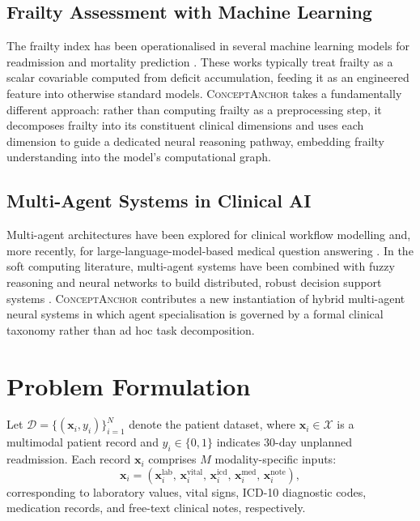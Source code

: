 \documentclass[review,12pt,authoryear]{elsarticle}
\newcommand{\modelname}{\textsc{ConceptAnchor}}
\begin{document}
\subsection{Frailty Assessment with Machine Learning}

The frailty index has been operationalised in several machine learning models for readmission and mortality prediction \citep{segal2019frailty, stow2019predicting}.
These works typically treat frailty as a scalar covariable computed from deficit accumulation, feeding it as an engineered feature into otherwise standard models.
\modelname{} takes a fundamentally different approach: rather than computing frailty as a preprocessing step, it decomposes frailty into its constituent clinical dimensions and uses each dimension to guide a dedicated neural reasoning pathway, embedding frailty understanding into the model's computational graph.

\subsection{Multi-Agent Systems in Clinical AI}

Multi-agent architectures have been explored for clinical workflow modelling \citep{isern2010agents} and, more recently, for large-language-model-based medical question answering \citep{tang2023medagents}.
In the soft computing literature, multi-agent systems have been combined with fuzzy reasoning and neural networks to build distributed, robust decision support systems \citep{abraham2005hybrid}.
\modelname{} contributes a new instantiation of hybrid multi-agent neural systems in which agent specialisation is governed by a formal clinical taxonomy rather than ad hoc task decomposition.

\section{Problem Formulation}
\label{sec:problem}

Let $\mathcal{D} = \{(\mathbf{x}_i, y_i)\}_{i=1}^{N}$ denote the patient dataset, where $\mathbf{x}_i \in \mathcal{X}$ is a multimodal patient record and $y_i \in \{0,1\}$ indicates 30-day unplanned readmission.
Each record $\mathbf{x}_i$ comprises $M$ modality-specific inputs:
\begin{equation}
  \mathbf{x}_i = \left(\mathbf{x}_i^{\text{lab}},\, \mathbf{x}_i^{\text{vital}},\, \mathbf{x}_i^{\text{icd}},\, \mathbf{x}_i^{\text{med}},\, \mathbf{x}_i^{\text{note}}\right),
\end{equation}
corresponding to laboratory values, vital signs, ICD-10 diagnostic codes, medication records, and free-text clinical notes, respectively.
\end{document}
